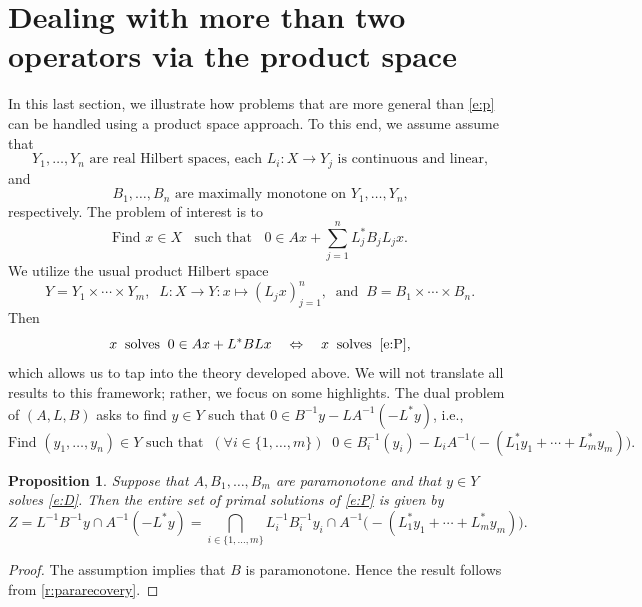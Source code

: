 \documentclass{article}
\providecommand{\siff}{\Leftrightarrow}
\newtheorem{proposition}[theorem]{Proposition}
\begin{document}
\section{Dealing with more than two operators via the product space}

\label{s:prod}

In this last section, we illustrate how problems that are more general 
than \cref{e:p} can be handled using a product space approach. 
To this end, we assume assume that 
\begin{equation}
\text{$Y_1,\ldots,Y_n$ are real Hilbert spaces, 
each $L_i\colon X\to Y_j$ is continuous and linear,}
\end{equation}
and 
\begin{equation}
\text{$B_1,\ldots,B_n$ are maximally monotone on $Y_1,\ldots,Y_n$,}
\end{equation}
respectively. 
The problem of interest is to 
\begin{equation}
\label{e:P}
\text{Find $x\in X\;\;$ such that $\;\;0\in Ax+ \sum_{j=1}^nL_j^*B_jL_jx$.}
\end{equation}
We utilize the usual product Hilbert space 
\begin{equation}
Y = Y_1\times \cdots \times Y_m,\;\;
L\colon X\to Y \colon x \mapsto (L_jx)_{j=1}^n,
\;\;\text{and}\;\;
B = B_1\times \cdots \times B_n. 
\end{equation}
Then 
\begin{equation}
x \;\; \text{solves}\;\;
0\in Ax + L^*BL x
\quad\siff\quad
x
\;\;\text{solves}\;\;\cref{e:P},
\end{equation}
which allows us to tap into the theory developed above. 
We will not translate all results to this framework; rather, 
we focus on some highlights. 
The dual problem of $(A,L,B)$ asks to 
find $y\in Y$ such that 
$0\in B^{-1}y -L A^{-1}(-L^*y)$, 
i.e., 
\begin{equation}
\label{e:D}
\text{Find $(y_1,\ldots,y_n)\in Y$ such that} 
\;\;(\forall i\in\{1,\ldots,m\})\;\;
0 \in B_i^{-1}(y_i)-L_iA^{-1}\big(-(L_1^*y_1+\cdots+L_m^*y_m)\big). 
\end{equation}

\begin{proposition}
Suppose that $A,B_1,\ldots,B_m$ are paramonotone and 
that $y\in Y$ solves \cref{e:D}. 
Then the entire set of primal solutions of \cref{e:P} is given by
\begin{equation}
Z = L^{-1}B^{-1}y \cap A^{-1}(-L^*y) = 
\bigcap_{i\in\{1,\ldots,m\}}L_i^{-1}B_i^{-1}y_i 
\cap A^{-1}\big(-(L_1^*y_1+\cdots+L_m^*y_m)\big). 
\end{equation}
\end{proposition}
\begin{proof}
The assumption implies that $B$ is paramonotone. 
Hence the result follows from  \cref{r:pararecovery}. 
\end{proof}
\end{document}
